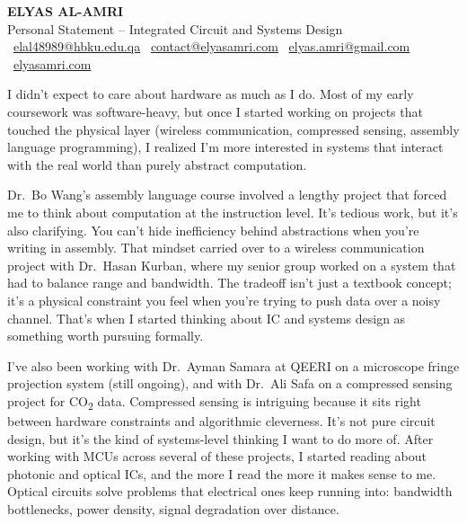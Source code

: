 \documentclass[11pt,a4paper]{article}
\begin{document}
\begin{center}
    {\Large\bfseries\color{headercolor} ELYAS AL-AMRI} \\[4pt]
    {\normalsize Personal Statement -- Integrated Circuit and Systems Design} \\[2pt]
    {\small \faEnvelope\ \href{mailto:elal48989@hbku.edu.qa}{elal48989@hbku.edu.qa} \quad \faEnvelope\ \href{mailto:contact@elyasamri.com}{contact@elyasamri.com} \quad \faEnvelope\ \href{mailto:elyas.amri@gmail.com}{elyas.amri@gmail.com} \quad \faGlobe\ \href{https://elyasamri.com}{elyasamri.com}}
\end{center}

\vspace{6pt}

I didn't expect to care about hardware as much as I do. Most of my early coursework was software-heavy, but once I started working on projects that touched the physical layer (wireless communication, compressed sensing, assembly language programming), I realized I'm more interested in systems that interact with the real world than purely abstract computation.

Dr.\ Bo Wang's assembly language course involved a lengthy project that forced me to think about computation at the instruction level. It's tedious work, but it's also clarifying. You can't hide inefficiency behind abstractions when you're writing in assembly. That mindset carried over to a wireless communication project with Dr.\ Hasan Kurban, where my senior group worked on a system that had to balance range and bandwidth. The tradeoff isn't just a textbook concept; it's a physical constraint you feel when you're trying to push data over a noisy channel. That's when I started thinking about IC and systems design as something worth pursuing formally.

I've also been working with Dr.\ Ayman Samara at QEERI on a microscope fringe projection system (still ongoing), and with Dr.\ Ali Safa on a compressed sensing project for CO\textsubscript{2} data. Compressed sensing is intriguing because it sits right between hardware constraints and algorithmic cleverness. It's not pure circuit design, but it's the kind of systems-level thinking I want to do more of. After working with MCUs across several of these projects, I started reading about photonic and optical ICs, and the more I read the more it makes sense to me. Optical circuits solve problems that electrical ones keep running into: bandwidth bottlenecks, power density, signal degradation over distance.
\end{document}

